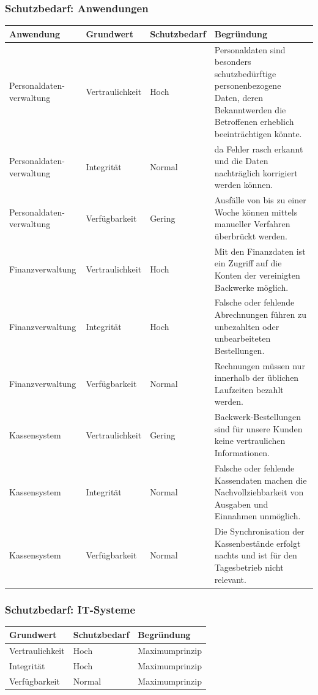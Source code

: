 \subsubsection{Schutzbedarf: Anwendungen}
\begin{minipage}{\textwidth}
\begin{center}
\begin{tabular}{p{3.5cm}llp{6.3cm}}
\toprule
Anwendung & Grundwert & Schutzbedarf & Begründung \\
\midrule
Personaldaten-verwaltung & Vertraulichkeit & Hoch & Personaldaten sind besonders schutzbedürftige personenbezogene Daten, deren Bekanntwerden die Betroffenen erheblich beeinträchtigen könnte. \\
Personaldaten-verwaltung & Integrität & Normal & da Fehler rasch erkannt und die Daten nachträglich korrigiert werden können. \\
Personaldaten-verwaltung & Verfügbarkeit & Gering & Ausfälle von bis zu einer Woche können mittels manueller Verfahren überbrückt werden. \\
Finanzverwaltung & Vertraulichkeit & Hoch & Mit den Finanzdaten ist ein Zugriff auf die Konten der vereinigten Backwerke möglich. \\
Finanzverwaltung & Integrität & Hoch & Falsche oder fehlende Abrechnungen führen zu unbezahlten oder unbearbeiteten Bestellungen. \\
Finanzverwaltung & Verfügbarkeit & Normal & Rechnungen müssen nur innerhalb der üblichen Laufzeiten bezahlt werden. \\
Kassensystem & Vertraulichkeit & Gering & Backwerk-Bestellungen sind für unsere Kunden keine vertraulichen Informationen. \\
Kassensystem & Integrität & Normal & Falsche oder fehlende Kassendaten machen die Nachvollziehbarkeit von Ausgaben und Einnahmen unmöglich. \\
Kassensystem & Verfügbarkeit & Normal & Die Synchronisation der Kassenbestände erfolgt nachts und ist für den Tagesbetrieb nicht relevant.\\
\bottomrule
\end{tabular}
\end{center}
\end{minipage}

\subsubsection{Schutzbedarf: IT-Systeme}
\begin{minipage}{\textwidth}
\begin{center}
\begin{tabular}{lll}
\toprule
Grundwert & Schutzbedarf & Begründung \\
\midrule
Vertraulichkeit & Hoch & Maximumprinzip \\
Integrität & Hoch & Maximumprinzip \\
Verfügbarkeit & Normal & Maximumprinzip \\
\bottomrule
\end{tabular}
\end{center}
\end{minipage}

